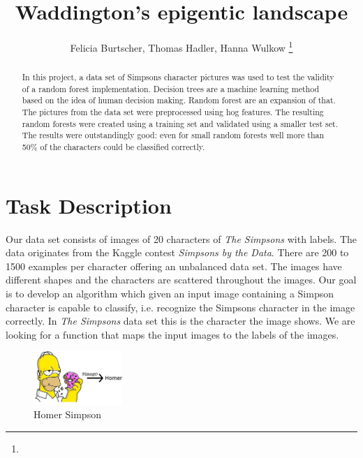 \documentclass[journal, a4paper]{IEEEtran}
\begin{document}
	\title{Waddington's epigentic landscape}
	\author{Felicia Burtscher, Thomas Hadler, Hanna Wulkow 
	\thanks{}}
	\maketitle

\begin{abstract}
In this project, a data set of Simpsons character pictures was used to test the validity of a random forest implementation. Decision trees are a machine learning method based on the idea of human decision making. Random forest are an expansion of that. The pictures from the data set were preprocessed using hog features.
The resulting random forests were created using a training set and validated using a smaller test set. The results were outstandingly good: even for small random forests well more than 50\% of the characters could be classified correctly. 
\end{abstract}
\section{Task Description}

Our data set consists of images of 20 characters of \textit{The Simpsons} with labels. The data originates from the Kaggle contest \textit{Simpsons by the Data}. There are 200 to 1500 examples per character offering an unbalanced data set. The images have different shapes and the characters are scattered throughout the images. Our goal is to develop an algorithm which given an input image containing a Simpson character is capable to classify, i.e. recognize the Simpsons character in the image correctly. In \textit{The Simpsons} data set this is the character the image shows. We are looking for a function that maps the input images to the labels of the images.
\begin{figure}[!ht]
	\centering
  \includegraphics[width=0.3\textwidth]{Image3.jpeg}
	\caption{Homer Simpson}
	\label{Homer}
\end{figure}
\end{document}
